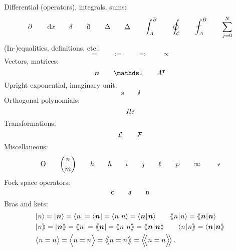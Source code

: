 	Differential (operators), integrals, sums:
	\begin{equation}
		\partial
		    \qquad
		\diff{x}
		    \qquad
		\delta
		    \qquad
		\eth
		    \qquad
		\laplaceOp
			\qquad
		\discreteLaplaceOp
		  \qquad
		\int_A^B  
			\qquad 
		\oint_\complexPath  
			\qquad 
		\fint_A^B  
			\qquad 
		\sum_{j=0}^{N}  
	\end{equation}
	(In-)equalities, definitions, etc.:
	\begin{equation}
		= 
			\qquad
		\coloneqq  
			\qquad 
		\eqqcolon  
			\qquad 
		\propto
	\end{equation}
	Vectors, matrices:\\
	\begin{equation}
		\vect{n}   
		  \qquad 
		\unitMatrix
		  \qquad 
		A^\transpose   
	\end{equation}
	Upright exponential, imaginary unit:
	\begin{equation}
		\ee  
			\qquad 
		\ii   
	\end{equation}
	Orthogonal polynomials:
	\begin{equation}
		\mathit{He}
	\end{equation}
	Transformations:
	\begin{equation}
		\mathcal{L}
		    \qquad
		\mathcal{F}
	\end{equation}
	Miscellaneous:
	\begin{equation}
		\mathord{\mathrm{O}} 
			\qquad 
		\binom{n}{m}
			\qquad
		\hbar 
			\qquad
		\hslash 
			\qquad
		\imath 
			\qquad
		\jmath 
			\qquad
		\ell 
			\qquad
		\wp 
			\qquad
		\infty 
			\qquad
		\backepsilon 
	\end{equation}
	Fock space operators:
	\begin{equation}
	   \mathsf{c}
	     \qquad
	   \mathsf{a}
		  \qquad
		\mathsf{n}
	\end{equation}
	Bras and kets:
	\begin{align}
		&\ketA{n} = \ketA{\vect{n}} =  \braA{n} = \braA{\vect{n}}   
		= \braketA{n}{n} = \braketA{\vect{n}}{\vect{n}}  			\label{eq:equation_3} 
		\qquad\braketBA{n}{n} = \braketBA{\vect{n}}{\vect{n}}  	\\
		&\ketB{n} = \ketB{\vect{n}} =  \braB{n} = \braB{\vect{n}}  		
		= \braketB{n}{n} = \braketB{\vect{n}}{\vect{n}}  		\label{eq:equation_4}
		\qquad\braketAB{n}{n} = \braketAB{\vect{n}}{\vect{n}}  		\\
		&\bigLangle n  = n \bigRangle  = \BigLangle n = n \BigRangle  
		= \bigLLangle n  = n \bigRRangle = \BigLLangle n = n \BigRRangle
			\,.
	\end{align}
	\vfill
	\pagebreak



